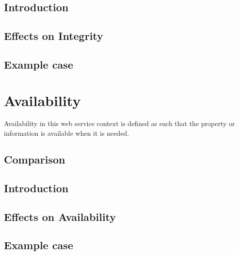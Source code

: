 \subsection{Introduction}
\subsection{Effects on Integrity}
\subsection{Example case}



\section{Availability}
\begin{sloppypar}
    Availability in this web service context is defined as such that the property or information 
    is available when it is needed.

    
    
\end{sloppypar}

\subsection{Comparison}
\begin{sloppypar}
    
\end{sloppypar}


\subsection{Introduction}
\begin{sloppypar}

\end{sloppypar}

\subsection{Effects on Availability}
\begin{sloppypar}

\end{sloppypar}

\subsection{Example case}
\begin{sloppypar}

\end{sloppypar}




